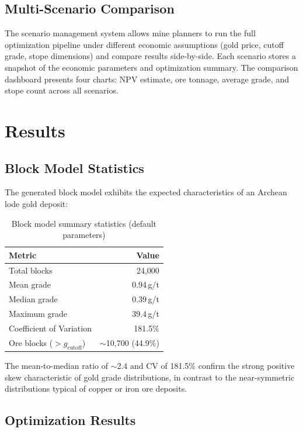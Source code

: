 \documentclass[12pt,a4paper]{article}
\begin{document}
\subsection{Multi-Scenario Comparison}
\label{sec:scenarios}

The scenario management system allows mine planners to run the full optimization pipeline under different economic assumptions (gold price, cutoff grade, stope dimensions) and compare results side-by-side. Each scenario stores a snapshot of the economic parameters and optimization summary. The comparison dashboard presents four charts: NPV estimate, ore tonnage, average grade, and stope count across all scenarios.

\section{Results}
\label{sec:results}

\subsection{Block Model Statistics}

The generated block model exhibits the expected characteristics of an Archean lode gold deposit:

\begin{table}[H]
\centering
\caption{Block model summary statistics (default parameters)}
\begin{tabular}{@{}lr@{}}
\toprule
\textbf{Metric} & \textbf{Value} \\
\midrule
Total blocks & 24{,}000 \\
Mean grade & 0.94\,g/t \\
Median grade & 0.39\,g/t \\
Maximum grade & 39.4\,g/t \\
Coefficient of Variation & 181.5\% \\
Ore blocks ($> g_{\text{cutoff}}$) & $\sim$10{,}700 (44.9\%) \\
\bottomrule
\end{tabular}
\end{table}

The mean-to-median ratio of $\sim$2.4 and CV of 181.5\% confirm the strong positive skew characteristic of gold grade distributions, in contrast to the near-symmetric distributions typical of copper or iron ore deposits.

\subsection{Optimization Results}
\end{document}
